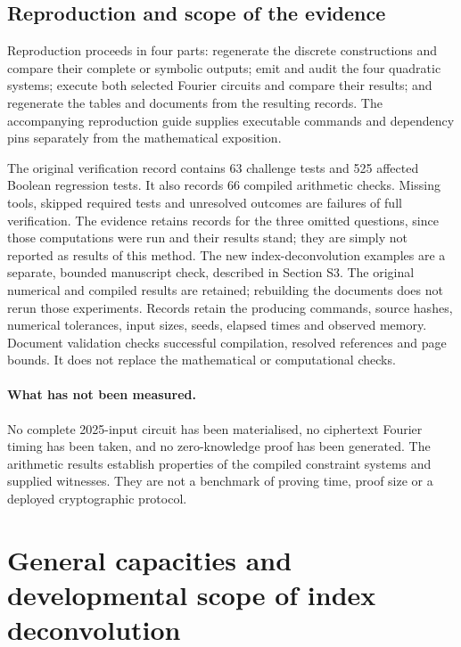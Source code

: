 \documentclass[11pt,a4paper]{article}
\begin{document}


\subsection{Reproduction and scope of the evidence}
Reproduction proceeds in four parts: regenerate the discrete constructions and
compare their complete or symbolic outputs; emit and audit the four quadratic
systems; execute both selected Fourier circuits and compare their results;
and regenerate the tables and documents from the resulting records. The
accompanying reproduction guide supplies executable commands and dependency
pins separately from the mathematical exposition.

The original verification record contains 63 challenge tests and 525 affected
Boolean regression tests. It also records 66 compiled arithmetic checks.
Missing tools, skipped required tests and unresolved outcomes are failures of
full verification. The evidence retains records for the three omitted
questions, since those computations were run and their results stand; they are
simply not reported as results of this method.
The new index-deconvolution examples are a separate, bounded manuscript
check, described in Section S3. The original numerical and compiled results
are retained; rebuilding the documents does not rerun those experiments.
Records retain the producing commands, source hashes, numerical tolerances,
input sizes, seeds, elapsed times and observed memory. Document validation
checks successful compilation, resolved references and page bounds. It does
not replace the mathematical or computational checks.

\paragraph{What has not been measured.}
No complete 2025-input circuit has been materialised, no ciphertext Fourier
timing has been taken, and no zero-knowledge proof has been generated.
The arithmetic results establish properties of the compiled constraint
systems and supplied witnesses. They are not a benchmark of proving time,
proof size or a deployed cryptographic protocol.

\section{General capacities and developmental scope of index deconvolution}
\label{sec:index-capacities}
\end{document}
